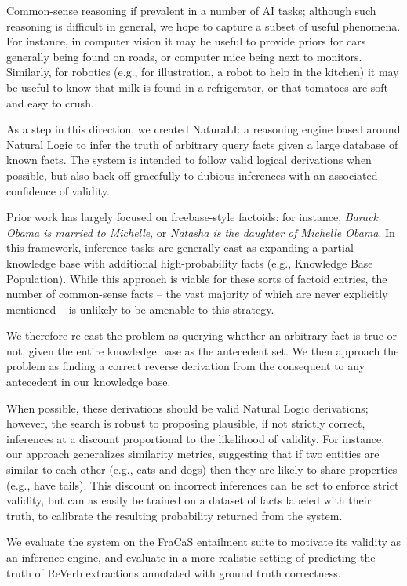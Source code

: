 Common-sense reasoning if prevalent in a number of AI tasks;
  although such reasoning is difficult in general, we hope to
  capture a subset of useful phenomena.
For instance, in computer vision it may be useful to provide priors
  for cars generally being found on roads, or
  computer mice being next to monitors.
Similarly, for robotics (e.g., for illustration, a robot to help in
  the kitchen) it may be useful to know that milk is found
  in a refrigerator, or that tomatoes are soft and easy to crush.

As a step in this direction, we created NaturaLI: a reasoning engine
  based around Natural Logic to infer the truth of arbitrary query
  facts given a large database of known facts.
The system is intended to follow valid logical derivations when possible,
  but also back off gracefully to dubious inferences with an
  associated confidence of validity.

Prior work has largely focused on freebase-style factoids:
  for instance, \textit{Barack Obama is married to Michelle}, or
  \textit{Natasha is the daughter of Michelle Obama}.
In this framework, inference tasks are generally cast as expanding
  a partial knowledge base with additional high-probability facts
  (e.g., Knowledge Base Population).
While this approach is viable for these sorts of factoid entries,
  the number of common-sense facts -- the vast majority of which are
  never explicitly mentioned -- is unlikely to be amenable to this
  strategy.

We therefore re-cast the problem as querying whether an arbitrary fact
  is true or not, given the entire knowledge base as the
  antecedent set.
We then approach the problem as finding a correct reverse derivation
  from the consequent to any antecedent in our knowledge base.

When possible, these derivations should be valid Natural Logic derivations;
  however, the search is robust to proposing plausible, if not
  strictly correct, inferences at a discount proportional to the
  likelihood of validity.
For instance, our approach generalizes similarity metrics, suggesting
  that if two entities are similar to each other (e.g., cats and dogs)
  then they are likely to share properties (e.g., have tails).
This discount on incorrect inferences can be set to enforce strict
  validity, but can as easily be trained on a dataset of facts labeled
  with their truth, to calibrate the resulting probability returned
  from the system.

We evaluate the system on the FraCaS entailment suite to motivate its
  validity as an inference engine, and evaluate in a more realistic
  setting of predicting the truth of ReVerb extractions
  \cite{key:2011fader-reverb} annotated with ground truth correctness.
